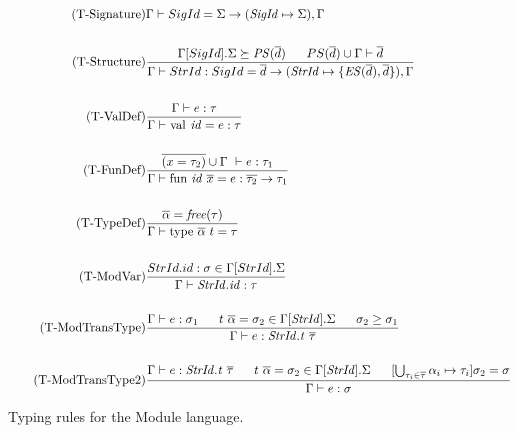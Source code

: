 \begin{figure}[htbp]
\begin{align*}
\tag{T-Signature}
&\Gamma \vdash SigId = \Sigma \rightarrow (\mathit{SigId} \mapsto \Sigma),\Gamma
\\
\\
\tag{T-Structure}
&\frac
{\Gamma[SigId].\Sigma \succeq \mathit{PS}(\overline{d}) \longspace PS(\overline{d}) \cup \Gamma \vdash \overline{d}}
{\Gamma \vdash StrId : SigId = \overline{d} \rightarrow (\mathit{StrId} \mapsto \lbrace \mathit{ES}(\overline{d}), \overline{d}\rbrace),\Gamma}
\\
\\
\tag{T-ValDef}
&\frac
{\Gamma \vdash e:\tau}
{\Gamma \vdash \text{\lsttext{val}}\ \mathit{id} = e:\tau}
\\
\\
\tag{T-FunDef}
&\frac
{\overline{(x = \tau_{2})} \cup \Gamma\ \vdash e:\tau_{1}}
{\Gamma \vdash \text{\lsttext{fun}}\ \mathit{id}\ \overline{x}= e:\overline{\tau_{2}} \rightarrow \tau_{1}}
\\
\\
\tag{T-TypeDef}
&\frac
{\overline{\alpha} = \mathit{free(\tau)}}
{\Gamma \vdash \text{\lsttext{type}}\ \overline{\alpha}\ t = \tau}
\\
\\
\tag{T-ModVar}
&\frac
{StrId.id:\sigma \in \Gamma[StrId].\Sigma}
{\Gamma \vdash \mathit{StrId.id} : \tau}
\\
\\
\tag{T-ModTransType}
&\frac
{\Gamma \vdash e:\sigma_{1} \longspace t\ \overline{\alpha} = \sigma_{2} \in \Gamma[\mathit{StrId}].\Sigma \longspace \sigma_{2} \geq \sigma_{1}}
{\Gamma \vdash e : \mathit{StrId.t}\ \overline{\tau}}
\\
\\
\tag{T-ModTransType2}
&\frac
{\Gamma \vdash e:\mathit{StrId.t}\ \overline{\tau} \longspace t\ \overline{\alpha} = \sigma_{2} \in \Gamma[\mathit{StrId}].\Sigma \longspace [\bigcup_{\tau_{i} \in \overline{\tau}} \alpha_{i} \mapsto \tau_{i}]\sigma_{2} = \sigma}
{\Gamma \vdash e:\sigma}
\end{align*}
\caption{Typing rules for the Module language. \label{fig:TypeRulesModule}}
\end{figure}


